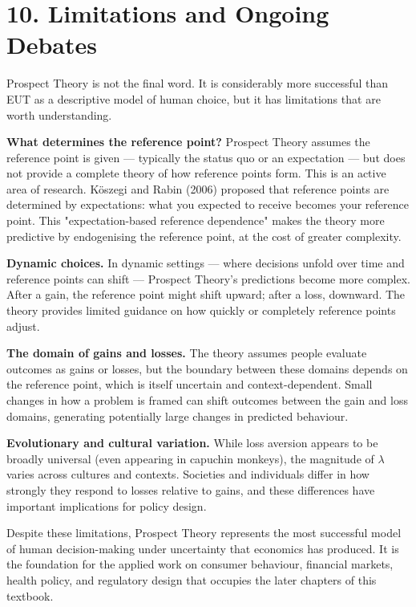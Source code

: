 \documentclass[12pt, letterpaper]{article}
\begin{document}
\medskip


\section{10. Limitations and Ongoing Debates}


Prospect Theory is not the final word. It is considerably more successful than EUT as a descriptive model of human choice, but it has limitations that are worth understanding.

\textbf{What determines the reference point?} Prospect Theory assumes the reference point is given --- typically the status quo or an expectation --- but does not provide a complete theory of how reference points form. This is an active area of research. Köszegi and Rabin (2006) proposed that reference points are determined by expectations: what you expected to receive becomes your reference point. This "expectation-based reference dependence" makes the theory more predictive by endogenising the reference point, at the cost of greater complexity.

\textbf{Dynamic choices.} In dynamic settings --- where decisions unfold over time and reference points can shift --- Prospect Theory's predictions become more complex. After a gain, the reference point might shift upward; after a loss, downward. The theory provides limited guidance on how quickly or completely reference points adjust.

\textbf{The domain of gains and losses.} The theory assumes people evaluate outcomes as gains or losses, but the boundary between these domains depends on the reference point, which is itself uncertain and context-dependent. Small changes in how a problem is framed can shift outcomes between the gain and loss domains, generating potentially large changes in predicted behaviour.

\textbf{Evolutionary and cultural variation.} While loss aversion appears to be broadly universal (even appearing in capuchin monkeys), the magnitude of $\lambda$ varies across cultures and contexts. Societies and individuals differ in how strongly they respond to losses relative to gains, and these differences have important implications for policy design.

Despite these limitations, Prospect Theory represents the most successful model of human decision-making under uncertainty that economics has produced. It is the foundation for the applied work on consumer behaviour, financial markets, health policy, and regulatory design that occupies the later chapters of this textbook.
\end{document}
